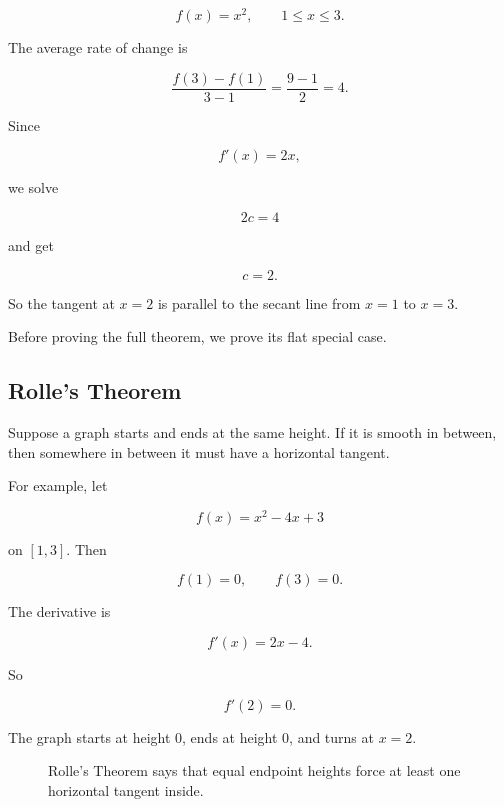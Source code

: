 \[
f(x)=x^2,
\qquad 1\le x\le 3.
\]

The average rate of change is

\[
\frac{f(3)-f(1)}{3-1}
=
\frac{9-1}{2}
=
4.
\]

Since

\[
f'(x)=2x,
\]

we solve

\[
2c=4
\]

and get

\[
c=2.
\]

So the tangent at \(x=2\) is parallel to the secant line from \(x=1\) to \(x=3\).

Before proving the full theorem, we prove its flat special case.

\subsection{Rolle's Theorem}
\label{subsec:rolles-theorem}

Suppose a graph starts and ends at the same height.  If it is smooth in between,
then somewhere in between it must have a horizontal tangent.

For example, let

\[
f(x)=x^2-4x+3
\]

on \([1,3]\).  Then

\[
f(1)=0,
\qquad
f(3)=0.
\]

The derivative is

\[
f'(x)=2x-4.
\]

So

\[
f'(2)=0.
\]

The graph starts at height \(0\), ends at height \(0\), and turns at \(x=2\).

\begin{figure}[h]
\centering
{}
\caption{Rolle's Theorem says that equal endpoint heights force at least one horizontal tangent inside.}
\label{fig:rolles-theorem-example}
\end{figure}

